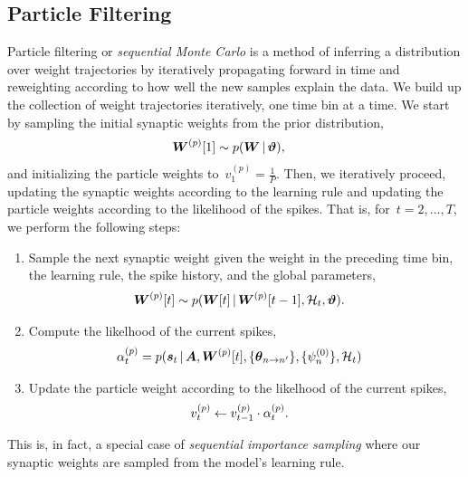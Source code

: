 \subsection{Particle Filtering}
Particle filtering \cite{andrieu2003introduction} or \emph{sequential
  Monte Carlo} is a method of inferring a distribution over weight
trajectories by iteratively propagating forward in time and
reweighting according to how well the new samples explain the data.
We build up the collection of weight trajectories iteratively, one
time bin at a time. We start by sampling the initial synaptic weights
from the prior distribution,
\begin{align*}
  \boldsymbol{W}^{(p)}[1] &\sim p(\boldsymbol{W} \,|\, \boldsymbol{\vartheta}),
\end{align*}
and initializing the particle weights to~${v_1^{(p)} = \frac{1}{P}}$.
Then, we iteratively proceed, updating the synaptic weights according to the 
learning rule and updating the particle weights according to the likelihood 
of the spikes. That is, for~${t=2, \ldots, T}$, we perform the following steps:
\begin{enumerate}
\item Sample the next synaptic weight given the weight in the
  preceding time bin, the learning rule, the spike history, and the
  global parameters,
  \begin{align*}
    \boldsymbol{W}^{(p)}[t] &\sim p(\boldsymbol{W}[t] \,|\, \boldsymbol{W}^{(p)}[t-1], \mathcal{H}_t, \boldsymbol{\vartheta}).
  \end{align*}

\item Compute the likelhood of the current spikes,
  \begin{align*}
    \alpha_t^{(p)} &= p(\boldsymbol{s}_t \,|\, \boldsymbol{A}, \boldsymbol{W}^{(p)}[t], \{\boldsymbol{\theta}_{n \to n'}\}, \{\psi_n^{(0)}\}, \mathcal{H}_t )
  \end{align*}
\item Update the particle weight according to the likelhood of the current spikes,
  \begin{align*}
    v_t^{(p)} &\leftarrow v_{t-1}^{(p)} \cdot \alpha_t^{(p)}.
  \end{align*}
\end{enumerate}
This is, in fact, a special case of \emph{sequential importance sampling} where
our synaptic weights are sampled from the model's learning rule.

